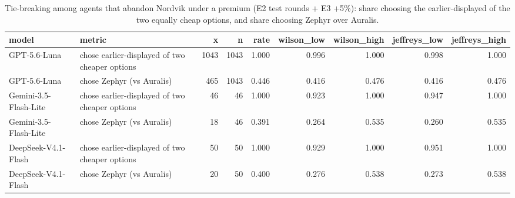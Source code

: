 \begin{table}[htbp]
\centering
\scriptsize
\caption{Tie-breaking among agents that abandon Nordvik under a premium (E2 test rounds + E3 +5\%): share choosing the earlier-displayed of the two equally cheap options, and share choosing Zephyr over Auralis.}
\label{tab:tab13_switch_destinations}
\begin{tabular}{llrrrrrrr}
\toprule
model & metric & x & n & rate & wilson\_low & wilson\_high & jeffreys\_low & jeffreys\_high \\
\midrule
GPT-5.6-Luna & chose earlier-displayed of two cheaper options & 1043 & 1043 & 1.000 & 0.996 & 1.000 & 0.998 & 1.000 \\
GPT-5.6-Luna & chose Zephyr (vs Auralis) & 465 & 1043 & 0.446 & 0.416 & 0.476 & 0.416 & 0.476 \\
Gemini-3.5-Flash-Lite & chose earlier-displayed of two cheaper options & 46 & 46 & 1.000 & 0.923 & 1.000 & 0.947 & 1.000 \\
Gemini-3.5-Flash-Lite & chose Zephyr (vs Auralis) & 18 & 46 & 0.391 & 0.264 & 0.535 & 0.260 & 0.535 \\
DeepSeek-V4.1-Flash & chose earlier-displayed of two cheaper options & 50 & 50 & 1.000 & 0.929 & 1.000 & 0.951 & 1.000 \\
DeepSeek-V4.1-Flash & chose Zephyr (vs Auralis) & 20 & 50 & 0.400 & 0.276 & 0.538 & 0.273 & 0.538 \\
\bottomrule
\end{tabular}
\end{table}